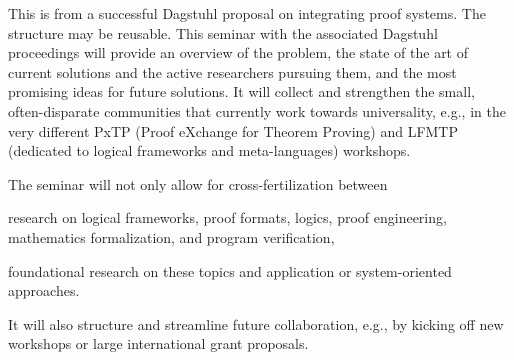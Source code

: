 \begin{oldpart}{This is from a successful Dagstuhl proposal on integrating proof systems. The structure may be reusable.}
This seminar with the associated Dagstuhl proceedings will provide an overview of the problem, the state of the art of current solutions and the active researchers pursuing them, and the most promising ideas for future solutions.
It will collect and strengthen the small, often-disparate communities that currently work towards universality, e.g., in the very different PxTP (Proof eXchange for Theorem Proving) and LFMTP (dedicated to logical frameworks and meta-languages) workshops.

The seminar will not only allow for cross-fertilization between
 \begin{compactitem}
  \item research on logical frameworks, proof formats, logics, proof engineering, mathematics formalization, and program verification,
  \item foundational research on these topics and application or system-oriented approaches.
 \end{compactitem}
It will also structure and streamline future collaboration, e.g., by kicking off new workshops or large international grant proposals.
\end{oldpart}